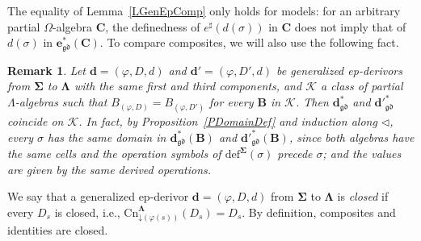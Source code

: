 \documentclass{amsart}
\newcommand{\vs}[1]{\mathbin{\downarrow}#1}
\theoremstyle{plain}
\newtheorem{remark}[theorem]{Remark}
\theoremstyle{definition}
\begin{document}
The equality of Lemma~\ref{LGenEpComp} only holds for models: for an arbitrary partial $\Omega$-algebra $\mathbf{C}$, the definedness of $e^{\sharp}(d(\sigma))$ in $\mathbf{C}$ does not imply that of $d(\sigma)$ in $\mathbf{e}^{\ast}_{\mathfrak{gd}}(\mathbf{C})$. To compare composites, we will also use the following fact.

\begin{remark}\label{RSameFunctor}
Let $\mathbf{d}=(\varphi,D,d)$ and $\mathbf{d}'=(\varphi,D',d)$ be generalized ep-derivors from $\mathbf{\Sigma}$ to $\mathbf{\Lambda}$ with the same first and third components, and $\mathcal{K}$ a class of partial $\Lambda$-algebras such that $B_{(\varphi,D)}=B_{(\varphi,D')}$ for every $\mathbf{B}$ in $\mathcal{K}$. Then $\mathbf{d}^{\ast}_{\mathfrak{gd}}$ and $\mathbf{d}'^{\ast}_{\mathfrak{gd}}$ coincide on $\mathcal{K}$. In fact, by Proposition~\ref{PDomainDef} and induction along $\lhd$, every $\sigma$ has the same domain in $\mathbf{d}^{\ast}_{\mathfrak{gd}}(\mathbf{B})$ and $\mathbf{d}'^{\ast}_{\mathfrak{gd}}(\mathbf{B})$, since both algebras have the same cells and the operation symbols of $\mathrm{def}^{\mathbf{\Sigma}}(\sigma)$ precede $\sigma$; and the values are given by the same derived operations.
\end{remark}

We say that a generalized ep-derivor $\mathbf{d}=(\varphi,D,d)$ from $\mathbf{\Sigma}$ to $\mathbf{\Lambda}$ is \emph{closed} if every $D_{s}$ is closed, i.e., $\mathrm{Cn}^{\mathbf{\Lambda}}_{\vs{(\varphi(s))}}(D_{s})=D_{s}$. By definition, composites and identities are closed.
\end{document}
